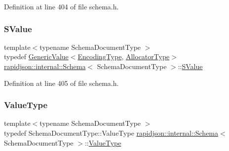Definition at line 404 of file schema.\+h.

\mbox{\label{classrapidjson_1_1internal_1_1_schema_a9f716b06fc542c4cdb7d8d5cf463bf79}} 
\subsubsection{\texorpdfstring{SValue}{SValue}}
{\footnotesize\ttfamily template$<$typename Schema\+Document\+Type $>$ \\
typedef \mbox{\hyperlink{classrapidjson_1_1_generic_value}{Generic\+Value}}$<$\mbox{\hyperlink{classrapidjson_1_1internal_1_1_schema_a39c052d3d1c7431fefc228c1007d0ecb}{Encoding\+Type}}, \mbox{\hyperlink{classrapidjson_1_1internal_1_1_schema_aaca940c164d906fdbf504f562bb2f956}{Allocator\+Type}}$>$ \mbox{\hyperlink{classrapidjson_1_1internal_1_1_schema}{rapidjson\+::internal\+::\+Schema}}$<$ Schema\+Document\+Type $>$\+::\mbox{\hyperlink{classrapidjson_1_1internal_1_1_schema_a9f716b06fc542c4cdb7d8d5cf463bf79}{S\+Value}}}



Definition at line 405 of file schema.\+h.

\mbox{\label{classrapidjson_1_1internal_1_1_schema_a3979a9083c598195927c08c6e3ba91d1}} 
\subsubsection{\texorpdfstring{ValueType}{ValueType}}
{\footnotesize\ttfamily template$<$typename Schema\+Document\+Type $>$ \\
typedef Schema\+Document\+Type\+::\+Value\+Type \mbox{\hyperlink{classrapidjson_1_1internal_1_1_schema}{rapidjson\+::internal\+::\+Schema}}$<$ Schema\+Document\+Type $>$\+::\mbox{\hyperlink{classrapidjson_1_1internal_1_1_schema_a3979a9083c598195927c08c6e3ba91d1}{Value\+Type}}}



